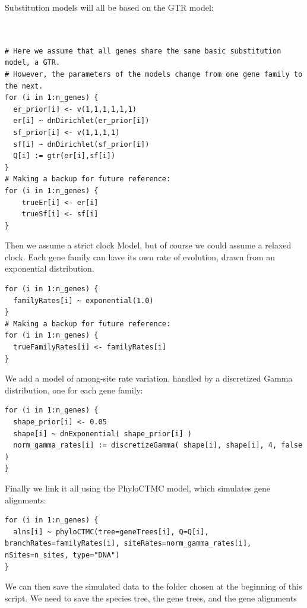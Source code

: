 \documentclass[11pt]{article}
\begin{document}
{\begin{framed}
Substitution models will all be based on the GTR model:
 {\tt \begin{snugshade*}
\begin{lstlisting}


# Here we assume that all genes share the same basic substitution model, a GTR.
# However, the parameters of the models change from one gene family to the next.
for (i in 1:n_genes) {
  er_prior[i] <- v(1,1,1,1,1,1)
  er[i] ~ dnDirichlet(er_prior[i])
  sf_prior[i] <- v(1,1,1,1)
  sf[i] ~ dnDirichlet(sf_prior[i])
  Q[i] := gtr(er[i],sf[i]) 
}
# Making a backup for future reference:
for (i in 1:n_genes) {
	trueEr[i] <- er[i]
	trueSf[i] <- sf[i]
}

\end{lstlisting}
\end{snugshade*}}

Then we assume a strict clock Model, but of course we could assume a relaxed clock.
Each gene family can have its own rate of evolution, drawn from an exponential distribution.
 {\tt \begin{snugshade*}
\begin{lstlisting}
for (i in 1:n_genes) {
  familyRates[i] ~ exponential(1.0)
}
# Making a backup for future reference:
for (i in 1:n_genes) {
  trueFamilyRates[i] <- familyRates[i] 
}

\end{lstlisting}
\end{snugshade*}}

We add a model of among-site rate variation, handled by a discretized Gamma distribution, one for each gene family:

 {\tt \begin{snugshade*}
\begin{lstlisting}
for (i in 1:n_genes) {
  shape_prior[i] <- 0.05 
  shape[i] ~ dnExponential( shape_prior[i] )
  norm_gamma_rates[i] := discretizeGamma( shape[i], shape[i], 4, false )
}
\end{lstlisting}
\end{snugshade*}}

Finally we link it all using the PhyloCTMC model, which simulates gene alignments:

 {\tt \begin{snugshade*}
\begin{lstlisting}
for (i in 1:n_genes) {
  alns[i] ~ phyloCTMC(tree=geneTrees[i], Q=Q[i],  branchRates=familyRates[i], siteRates=norm_gamma_rates[i], nSites=n_sites, type="DNA")
}
\end{lstlisting}
\end{snugshade*}}
We can then save the simulated data to the folder chosen at the beginning of this script.
We need to save the species tree, the gene trees, and the gene alignments


\end{framed}}
\end{document}
